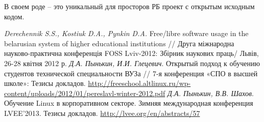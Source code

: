 В своем роде -- это уникальный для просторов РБ проект с открытым исходным кодом\cite{ps01}.

\begin{thebibliography}{9}
 \textit{Derechennik S.S., Kostiuk D.A., Pynkin D.A.} Free/libre software usage in the belarusian system of higher educational institutions // Друга міжнародна науково-практична конференція FOSS Lviv-2012: Збірник наукових праць/ Львів,  26-28 квітня 2012 р.
 \textit{Д.А. Пынькин, И.И. Глецевич}. Открытый подход к обучению студентов технической
	специальности ВУЗа // 7-я конференция «СПО в высшей школе»: Тезисы докладов. \url{http://freeschool.altlinux.ru/wp-content/uploads/2012/01/pereslavl-winter-2012.pdf}
 \textit{Д.А. Пынькин, В.В. Шахов}. Обучение Linux в корпоративном секторе. Зимняя международная конференция LVEE'2013. Тезисы докладов. \url{http://lvee.org/en/abstracts/57}

\end{thebibliography}


